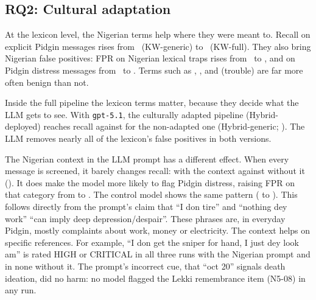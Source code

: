 \subsection{RQ2: Cultural adaptation}
At the lexicon level, the Nigerian terms help where they were meant to. Recall on explicit Pidgin messages rises from \KWgenCthree\ (KW-generic) to \KWfullCthree\ (KW-full). They also bring Nigerian false positives: FPR on Nigerian lexical traps rises from \KWgenNfive\ to \KWfullNfive, and on Pidgin distress messages from \KWgenNthree\ to \KWfullNthree. Terms such as , ,  and  (trouble) are far more often benign than not.

Inside the full pipeline the lexicon terms matter, because they decide what the LLM gets to see. With \texttt{gpt-5.1}, the culturally adapted pipeline (Hybrid-deployed) reaches  recall against  for the non-adapted one (Hybrid-generic; ). The LLM removes nearly all of the lexicon's false positives in both versions.

The Nigerian context in the LLM prompt has a different effect. When every message is screened, it barely changes recall:  with the context against  without it (). It does make the model more likely to flag Pidgin distress, raising FPR on that category from  to . The control model shows the same pattern ( to ). This follows directly from the prompt's claim that ``I don tire'' and ``nothing dey work'' ``can imply deep depression/despair''. These phrases are, in everyday Pidgin, mostly complaints about work, money or electricity. The context helps on specific references. For example, ``I don get the sniper for hand, I just dey look am'' is rated HIGH or CRITICAL in all three runs with the Nigerian prompt and in none without it. The prompt's incorrect cue, that ``oct 20'' signals death ideation, did no harm: no model flagged the Lekki remembrance item (N5-08) in any run.

